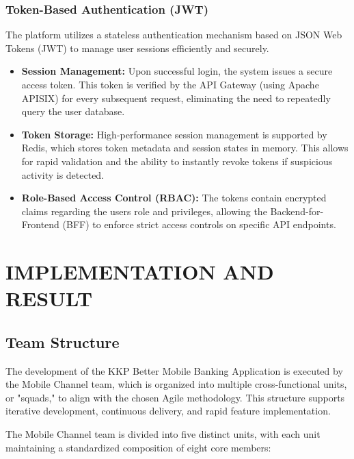 \documentclass[12pt,oneside,openright,a4paper]{cpe-english-project}
\begin{document}
\subsection{Token-Based Authentication (JWT)}

The platform utilizes a stateless authentication mechanism based on JSON
Web Tokens (JWT) to manage user sessions efficiently and securely.

\begin{itemize}
\item
  \textbf{Session Management:} Upon successful login, the system issues
  a secure access token. This token is verified by the API Gateway
  (using Apache APISIX) for every subsequent request, eliminating the
  need to repeatedly query the user database.
\item
  \textbf{Token Storage:} High-performance session management is
  supported by Redis, which stores token metadata and session states in
  memory. This allows for rapid validation and the ability to instantly
  revoke tokens if suspicious activity is detected.
\item
  \textbf{Role-Based Access Control (RBAC):} The tokens contain
  encrypted claims regarding the user\textquotesingle s role and
  privileges, allowing the Backend-for-Frontend (BFF) to enforce strict
  access controls on specific API endpoints.
\end{itemize}



\hfill\break


\chapter{IMPLEMENTATION AND RESULT}

\section{Team Structure}

The development of the KKP Better Mobile Banking Application is executed
by the Mobile Channel team, which is organized into multiple
cross-functional units, or "squads," to align with the chosen Agile
methodology. This structure supports iterative development, continuous
delivery, and rapid feature implementation.

\hfill\break
The Mobile Channel team is divided into five distinct units, with each
unit maintaining a standardized composition of eight core members:
\end{document}
